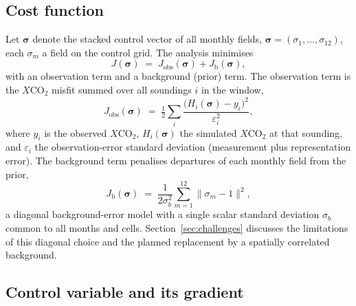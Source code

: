 \documentclass[12pt]{article}
\newcommand{\bm}[1]{\mathbf{#1}}
\newcommand{\xco}{X\mathrm{CO}_2}
\begin{document}
\subsection{Cost function}

Let $\bm{\sigma}$ denote the stacked control vector of all monthly fields,
$\bm{\sigma} = (\sigma_1,\dots,\sigma_{12})$, each $\sigma_m$ a field on the
control grid. The analysis minimises
%
\begin{equation}
  J(\bm{\sigma}) \;=\; J_{\mathrm{obs}}(\bm{\sigma}) + J_{\mathrm{b}}(\bm{\sigma}),
  \label{eq:cost}
\end{equation}
%
with an observation term and a background (prior) term. The observation term is
the $\xco$ misfit summed over all soundings $i$ in the window,
%
\begin{equation}
  J_{\mathrm{obs}}(\bm{\sigma}) \;=\; \tfrac{1}{2}
    \sum_i \frac{\big(H_i(\bm{\sigma}) - y_i\big)^2}{\varepsilon_i^2},
  \label{eq:jobs}
\end{equation}
%
where $y_i$ is the observed $\xco$, $H_i(\bm{\sigma})$ the simulated $\xco$ at
that sounding, and $\varepsilon_i$ the observation-error standard deviation
(measurement plus representation error). The background term penalises departures
of each monthly field from the prior,
%
\begin{equation}
  J_{\mathrm{b}}(\bm{\sigma}) \;=\; \frac{1}{2\sigma_b^2}
    \sum_{m=1}^{12} \lVert \sigma_m - 1 \rVert^2,
  \label{eq:jb}
\end{equation}
%
a diagonal background-error model with a single scalar standard deviation
$\sigma_b$ common to all months and cells. Section~\ref{sec:challenges}
discusses the limitations of this diagonal choice and the planned replacement by
a spatially correlated background.

\subsection{Control variable and its gradient}
\end{document}
